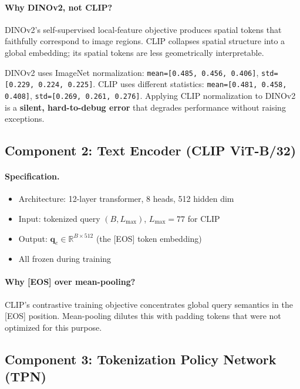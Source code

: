 \documentclass[11pt,a4paper]{article}
\newcommand{\R}{\mathbb{R}}
\newcommand{\qe}{\mathbf{q}_e}
\begin{document}
\paragraph{Why DINOv2, not CLIP?}
DINOv2's self-supervised local-feature objective produces spatial tokens
that faithfully correspond to image regions. CLIP collapses spatial
structure into a global embedding; its spatial tokens are less
geometrically interpretable.

\begin{warnbox}[title={Critical Normalization Warning}]
DINOv2 uses ImageNet normalization:
\texttt{mean=[0.485, 0.456, 0.406]}, \texttt{std=[0.229, 0.224, 0.225]}.
CLIP uses different statistics:
\texttt{mean=[0.481, 0.458, 0.408]}, \texttt{std=[0.269, 0.261, 0.276]}.
Applying CLIP normalization to DINOv2 is a \textbf{silent, hard-to-debug
error} that degrades performance without raising exceptions.
\end{warnbox}

\subsection{Component 2: Text Encoder (CLIP ViT-B/32)}

\paragraph{Specification.}
\begin{itemize}[leftmargin=1.5em, itemsep=1pt]
  \item Architecture: 12-layer transformer, 8 heads, 512 hidden dim
  \item Input: tokenized query $(B, L_{\max})$, $L_{\max} = 77$ for CLIP
  \item Output: $\qe \in \R^{B \times 512}$ (the [EOS] token embedding)
  \item All frozen during training
\end{itemize}

\paragraph{Why [EOS] over mean-pooling?}
CLIP's contrastive training objective concentrates global query semantics
in the [EOS] position. Mean-pooling dilutes this with padding tokens that
were not optimized for this purpose.

\subsection{Component 3: Tokenization Policy Network (TPN)}
\end{document}
